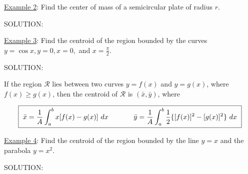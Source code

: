 \documentclass[paper=a4, fontsize=11pt]{scrartcl} %
\numberwithin{equation}{section} %
\numberwithin{figure}{section} %
\numberwithin{table}{section} %
\newcommand{\ds}{\displaystyle}
\begin{document}
\newpage
\underline{Example 2}: Find the center of mass of a semicircular plate of radius $r$.\\
\indent

SOLUTION:\\
\indent

\newpage
\underline{Example 3}: Find the centroid of the region bounded by the curves $y=\cos x, y=0, x=0,$ and $x=\ds\frac{\pi}{2}$.\\
\indent

SOLUTION:\\
\indent

\newpage

If the region $\mathcal{R}$ lies between two curves $y=f(x)$ and $y=g(x)$, where $f(x) \geq g(x)$, then the centroid of $\mathcal{R}$ is $(\bar{x},\bar{y})$, where

\[\boxed{\text{ }\bar{x} = \ds\frac{1}{A} \ds\int_a^b x[f(x) -g(x)]\text{ }dx \hspace{0.5in} \bar{y} = \ds\frac{1}{A} \ds\int_a^b \ds\frac{1}{2}\lbrace [f(x)]^2 - [g(x)]^2\rbrace \text{ }dx \text{ }}\]
\indent

\underline{Example 4}: Find the centroid of the region bounded by the line $y=x$ and the parabola $y=x^2$.\\
\indent

SOLUTION:\\
\indent


















\end{document}
